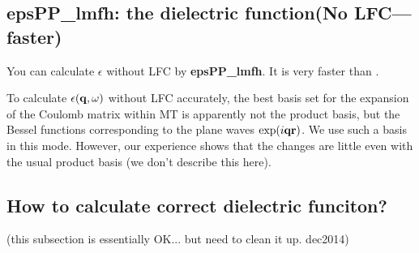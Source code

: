 \subsection{epsPP\_lmfh: the dielectric function(No LFC--- faster)}

You can calculate $\epsilon$ without LFC by
{\bf epsPP\_lmfh}. It is very faster than .

To calculate $\epsilon({\bf q},\omega)$ without LFC accurately,
the best basis set for the expansion of the Coulomb matrix within MT
is apparently not the product basis, but the Bessel functions
corresponding to the plane waves $\exp(i{\bf q r})$.
We use such a basis in this mode. 
However, our experience shows that the changes are little even 
with the usual product basis (we don't describe this here).
%



\subsection{How to calculate correct dielectric funciton?}

(this subsection is essentially OK... but need to clean it up. dec2014)

